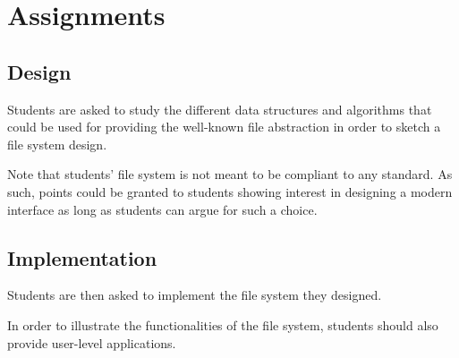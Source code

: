 \section{Assignments}


\subsection*{Design}

Students are asked to study the different data structures and algorithms
that could be used for providing the well-known file abstraction in
order to sketch a file system design.

Note that students' file system is not meant to be compliant to any standard.
As such, points could be granted to students showing interest in designing
a modern interface as long as students can argue for such a choice.


\subsection*{Implementation}

Students are then asked to implement the file system they designed.

In order to illustrate the functionalities of the file system, students
should also provide user-level applications.

